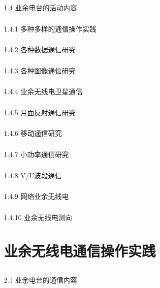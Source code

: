 \documentclass[12pt,UTF8]{ctexbook}
\begin{document}
\section{}1.4 业余电台的活动内容
\subsection{}1.4.1 多种多样的通信操作实践
\subsection{}1.4.2 各种数据通信研究
\subsection{}1.4.3 各种图像通信研究
\subsection{}1.4.4 业余无线电卫星通信
\subsection{}1.4.5 月面反射通信研究
\subsection{}1.4.6 移动通信研究
\subsection{}1.4.7 小功率通信研究
\subsection{}1.4.8 V/U波段通信
\subsection{}1.4.9 网络业余无线电
\subsection{}1.4.10 业余无线电测向

\chapter{业余无线电通信操作实践}

\section{}2.1 业余电台的通信内容
\end{document}
